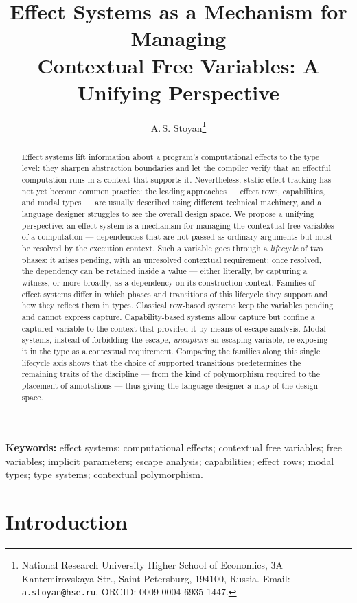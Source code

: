 \documentclass[11pt]{article}
\title{Effect Systems as a Mechanism for Managing\\ Contextual Free Variables: A Unifying Perspective}
\author{A.\,S. Stoyan\thanks{National Research University Higher School of Economics,
3A Kantemirovskaya Str., Saint Petersburg, 194100, Russia.
Email: \texttt{a.stoyan@hse.ru}. ORCID: 0009-0004-6935-1447.}}
\date{}
\begin{document}
\maketitle

\begin{abstract}
Effect systems lift information about a program's computational effects to the type
level: they sharpen abstraction boundaries and let the compiler verify that an effectful
computation runs in a context that supports it. Nevertheless, static effect tracking has
not yet become common practice: the leading approaches --- effect rows, capabilities, and
modal types --- are usually described using different technical machinery, and a
language designer struggles to see the overall design space. We propose a unifying perspective: an effect
system is a mechanism for managing the contextual free variables of a computation ---
dependencies that are not passed as ordinary arguments but must be resolved by the
execution context. Such a variable goes through a \emph{lifecycle} of two phases: it arises
pending, with an unresolved contextual requirement; once resolved, the dependency can be
retained inside a value --- either literally, by capturing a witness, or more broadly,
as a dependency on its construction context. Families of effect systems differ in
which phases and transitions of this lifecycle they support and how they reflect them in
types. Classical
row-based systems keep the variables pending and
cannot express capture. Capability-based systems allow capture but confine a captured
variable to the context that provided it by means of escape analysis. Modal systems,
instead of forbidding the escape, \emph{uncapture} an escaping variable, re-exposing it in
the type as a contextual requirement. Comparing the families along this single lifecycle axis shows
that the choice of supported transitions predetermines the remaining traits of the
discipline --- from the kind of polymorphism required to the placement of annotations ---
thus giving the language designer a map of the design space.
\end{abstract}

\noindent\textbf{Keywords:} effect systems; computational effects; contextual free variables; free variables; implicit parameters; escape analysis; capabilities; effect rows; modal types; type systems; contextual polymorphism.

\bigskip


\section{Introduction}
\end{document}
